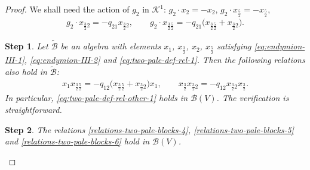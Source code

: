 \documentclass[10pt,a4paper]{amsart}
\numberwithin{equation}{section}
\newtheorem{stepiii}{Step}
\newcommand{\toba}{\mathscr B}
\newcommand{\wtoba}{\widetilde{\mathscr B}}
\newcommand{\K}{{\mathcal{K}}}
\newcommand{\tresdos}{\frac{3}{2}}
\newcommand{\cincodos}{\frac{5}{2}}
\begin{document}
\begin{proof}
We shall need the action of $g_2$ in $\K^1$: $g_2\cdot x_{2} = -x_{2}$,
$g_2\cdot x_{\cincodos} = -x_{\cincodos}$,
\begin{align*}
g_2 \cdot x_{\tresdos2} = -q_{21} x_{\tresdos2} , \qquad
g_2 \cdot x_{\tresdos\cincodos} = -q_{21} \big(x_{\tresdos\cincodos}+x_{\tresdos2}\big).
\end{align*}

\begin{stepiii}
Let $\wtoba$ be an algebra with elements $x_1$, $x_{\tresdos}$, $x_2$, $x_\cincodos$ satisfying
\eqref{eq:endymion-III-1}, \eqref{eq:endymion-III-2} and \eqref{eq:two-pale-def-rel-1}.
Then the following relations also hold in $\wtoba$:
\begin{align}\label{eq:two-pale-def-rel-other-1}
x_1x_{\tresdos\cincodos} = -q_{12}\big(x_{\tresdos\cincodos}+x_{\tresdos2}\big)x_1,\qquad
x_{\tresdos}x_{\tresdos2}=-q_{12}x_{\tresdos2}x_{\tresdos}.
\end{align}
In particular, \eqref{eq:two-pale-def-rel-other-1} holds in $\toba(V)$. The verification is straightforward.
\end{stepiii}

\begin{stepiii}%
The relations \eqref{relations-two-pale-blocks-4}, \eqref{relations-two-pale-blocks-5} and \eqref{relations-two-pale-blocks-6}
hold in $\toba(V)$.
\end{stepiii}


\end{proof}
\end{document}
